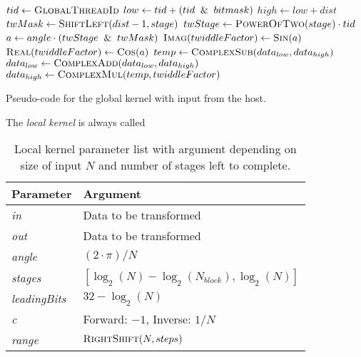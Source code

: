\begin{algorithm}
	\centering
	\begin{algorithmic}[1]
            \State $tid \gets \Call{GlobalThreadId}{}$ 
            \State $low \gets tid + (tid \And bitmask)$
            \State $high \gets low + dist$
            \newline
            \State $twMask \gets \Call{ShiftLeft}{dist - 1, stage}$
            \State $twStage \gets \Call{PowerOfTwo}{stage} \cdot tid$
            \State $a \gets angle \cdot (twStage \And twMask)$
            \State $\Call{Imag}{twiddleFactor} \gets \Call{Sin}{a}$
            \State $\Call{Real}{twiddleFactor} \gets \Call{Cos}{a}$
            \newline
            \State $temp \gets \Call{ComplexSub}{data_{low}, data_{high}}$
            \State $data_{low} \gets \Call{ComplexAdd}{data_{low}, data_{high}}$
            \State $data_{high} \gets \Call{ComplexMul}{temp, twiddleFactor}$
        \EndProcedure
	\end{algorithmic}
	\caption{Pseudo-code for the global kernel with input from the host.}
	\label{alg:device:global-kernel}
\end{algorithm}

The \textit{local kernel} is always called

\begin{table}
	\centering
	\begin{tabular}{|l|l|}
		\hline
		Parameter & Argument \\ \hline
		\textit{in} & Data to be transformed \\ \hline
		\textit{out} & Data to be transformed \\ \hline
		\textit{angle} & $(2 \cdot \pi)/N$ \\ \hline
		\textit{stages} & $[\log_{2}(N) - \log_{2}(N_{block}), \log_{2}(N)]$ \\ \hline
		\textit{leadingBits} & $32 - \log_{2}(N)$ \\ \hline
		\textit{c} & Forward: $-1$, Inverse: $1/N$ \\ \hline
		\textit{range} & $\Call{RightShift}{N, steps}$ \\ \hline		
	\end{tabular}
	\caption{Local kernel parameter list with argument depending on size of input $N$ and number of stages left to complete.}
	\label{tab:local-kernel}
\end{table}

